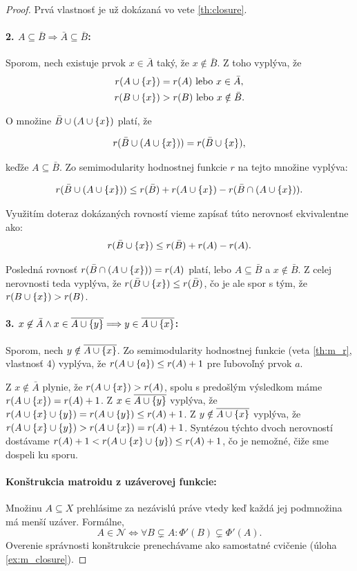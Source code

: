 \begin{proof}
Prvá vlastnosť je už dokázaná vo vete \ref{th:closure}.
\paragraph{2. $A \subseteq \bar{B} \Longrightarrow \bar{A} \subseteq \bar{B}$:}
Sporom, nech existuje prvok $x \in \bar{A}$ taký, že $x \notin \bar{B}$. Z toho vyplýva, že
\begin{align*}
	r(A\cup\left\{x\right\})&=r(A) \text{ lebo } x\in\bar{A}, \\
	r(B\cup\left\{x\right\})&>r(B) \text{ lebo } x\notin\bar{B}.\label{rb-rbx-unequality}
\end{align*}

O množine $\bar{B}\cup(A\cup\left\{x\right\})$ platí, že

$$r(\bar{B}\cup(A\cup\left\{x\right\}))=r(\bar{B}\cup\left\{x\right\}),$$

keďže $A\subseteq \bar{B}$. Zo semimodularity hodnostnej funkcie $r$ na tejto množine vyplýva:

$$r(\bar{B}\cup(A\cup\left\{x\right\}))\leq r(\bar{B})+r(A\cup\left\{x\right\})-r(\bar{B}\cap(A\cup\left\{x\right\})).$$

Využitím doteraz dokázaných rovností vieme zapísať túto nerovnosť ekvivalentne ako:
\begin{align*}
	r(\bar{B}\cup\left\{x\right\})\leq r(\bar{B})+r(A)-r(A).
\end{align*}

Posledná rovnosť $r(\bar{B}\cap(A\cup\left\{x\right\}))=r(A)$ platí, lebo $A\subseteq \bar{B}$ a $x\notin\bar{B}$. Z celej nerovnosti teda vyplýva, že $r(\bar{B}\cup\left\{x\right\})\leq r(\bar{B})$, čo je ale spor s tým, že ${r(B\cup\left\{x\right\})>r(B)}$.
\paragraph{3. $x \not\in \bar{A} \wedge x \in \overline{A \cup \left\{y\right\}} \Longrightarrow y \in \overline{A \cup \left\{x\right\}}$:}
Sporom, nech $y \notin\overline{A \cup \left\{x\right\}}$.
Zo semimodularity hodnostnej funkcie (veta \ref{th:m_r}, vlastnosť 4) vyplýva, že $r(A \cup \left\{a\right\}) \leq r(A) + 1$ pre ľubovoľný prvok $a$.

Z $x \not\in \bar{A}$ plynie, že $r(A \cup \left\{x\right\}) > r(A)$, spolu s predošlým výsledkom máme $r(A \cup \left\{x\right\}) = r(A) + 1$.
Z $x \in \overline{A \cup \left\{y\right\}}$ vyplýva, že $r(A \cup \left\{x\right\} \cup \left\{y\right\}) = r(A \cup \left\{y\right\}) \leq r(A) + 1$.
Z $y \notin\overline{A \cup \left\{x\right\}}$ vyplýva, že $r(A \cup \left\{x\right\} \cup \left\{y\right\}) > r(A \cup \left\{x\right\}) = r(A) + 1$.
Syntézou týchto dvoch nerovností dostávame $r(A) + 1 < r(A \cup \left\{x\right\} \cup \left\{y\right\}) \leq r(A) + 1$, čo je nemožné, čiže sme dospeli ku sporu.
\paragraph{Konštrukcia matroidu z uzáverovej funkcie:}
Množinu $A \subseteq X$ prehlásime za nezávislú práve vtedy keď každá jej podmnožina má menší uzáver.
Formálne, $$A \in \mathcal{N} \Longleftrightarrow \forall B \subsetneq A: \Phi'(B) \subsetneq \Phi'(A).$$
Overenie správnosti konštrukcie prenechávame ako samostatné cvičenie (úloha \ref{ex:m_closure}).
\end{proof}
